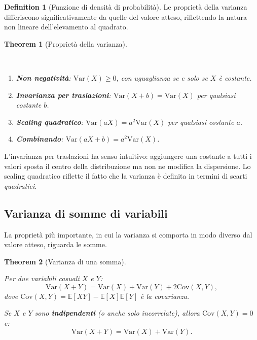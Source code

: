 \documentclass[
  letterpaper,
  DIV=11,
  numbers=noendperiod,
  oneside]{scrreprt}
\theoremstyle{definition}
\theoremstyle{plain}
\newtheorem{theorem}{Theorem}[chapter]
\theoremstyle{definition}
\newtheorem{definition}{Definition}[chapter]
\theoremstyle{remark}
\begin{document}
\begin{definition}[Funzione di densità di
probabilità]
Le proprietà della varianza differiscono significativamente da quelle
del valore atteso, riflettendo la natura non lineare dell'elevamento al
quadrato.

\begin{theorem}[Proprietà della
varianza]\protect\hypertarget{thm-variance-properties}{}\label{thm-variance-properties}

~

\begin{enumerate}
\def\labelenumi{\arabic{enumi}.}
\item
  \textbf{Non negatività}: \(\text{Var}(X) \geq 0\), con uguaglianza se
  e solo se \(X\) è costante.
\item
  \textbf{Invarianza per traslazioni}:
  \(\text{Var}(X + b) = \text{Var}(X)\) per qualsiasi costante \(b\).
\item
  \textbf{Scaling quadratico}: \(\text{Var}(aX) = a^2 \text{Var}(X)\)
  per qualsiasi costante \(a\).
\item
  \textbf{Combinando}: \(\text{Var}(aX + b) = a^2 \text{Var}(X)\).
\end{enumerate}

\end{theorem}

L'invarianza per traslazioni ha senso intuitivo: aggiungere una costante
a tutti i valori sposta il centro della distribuzione ma non ne modifica
la dispersione. Lo scaling quadratico riflette il fatto che la varianza
è definita in termini di scarti \emph{quadratici}.

\subsection{Varianza di somme di
variabili}\label{varianza-di-somme-di-variabili}

La proprietà più importante, in cui la varianza si comporta in modo
diverso dal valore atteso, riguarda le somme.

\begin{theorem}[Varianza di una
somma]\protect\hypertarget{thm-variance-sum}{}\label{thm-variance-sum}

Per due variabili casuali \(X\) e \(Y\): \[
\text{Var}(X + Y) = \text{Var}(X) + \text{Var}(Y) + 2\text{Cov}(X, Y),
\] dove
\(\text{Cov}(X, Y) = \mathbb{E}[XY] - \mathbb{E}[X]\mathbb{E}[Y]\) è la
\emph{covarianza}.

Se \(X\) e \(Y\) sono \textbf{indipendenti} (o anche solo incorrelate),
allora \(\text{Cov}(X, Y) = 0\) e: \[
\text{Var}(X + Y) = \text{Var}(X) + \text{Var}(Y).
\]


\end{theorem}
\end{definition}
\end{document}
